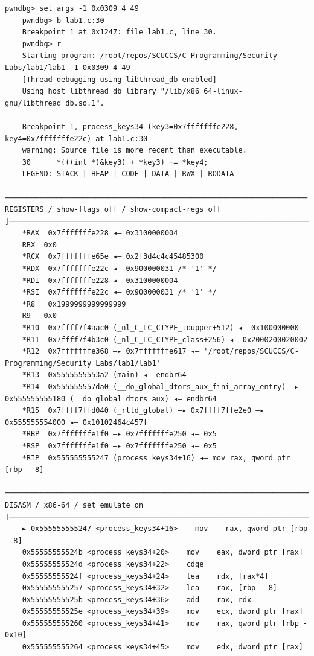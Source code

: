 \documentclass[a4pper,12pt,onecolumn]{article}
\begin{document}
\begin{lstlisting}[style=DOS]
    pwndbg> set args -1 0x0309 4 49
    pwndbg> b lab1.c:30
    Breakpoint 1 at 0x1247: file lab1.c, line 30.
    pwndbg> r
    Starting program: /root/repos/SCUCCS/C-Programming/Security Labs/lab1/lab1 -1 0x0309 4 49
    [Thread debugging using libthread_db enabled]
    Using host libthread_db library "/lib/x86_64-linux-gnu/libthread_db.so.1".

    Breakpoint 1, process_keys34 (key3=0x7fffffffe228, key4=0x7fffffffe22c) at lab1.c:30
    warning: Source file is more recent than executable.
    30	    *(((int *)&key3) + *key3) += *key4;
    LEGEND: STACK | HEAP | CODE | DATA | RWX | RODATA
    ──────────────────────────────────────────────────────────────────────[ REGISTERS / show-flags off / show-compact-regs off ]───────────────────────────────────────────────────────────────────────
    *RAX  0x7fffffffe228 ◂— 0x3100000004
    RBX  0x0
    *RCX  0x7fffffffe65e ◂— 0x2f3d4c4c45485300
    *RDX  0x7fffffffe22c ◂— 0x900000031 /* '1' */
    *RDI  0x7fffffffe228 ◂— 0x3100000004
    *RSI  0x7fffffffe22c ◂— 0x900000031 /* '1' */
    *R8   0x1999999999999999
    R9   0x0
    *R10  0x7ffff7f4aac0 (_nl_C_LC_CTYPE_toupper+512) ◂— 0x100000000
    *R11  0x7ffff7f4b3c0 (_nl_C_LC_CTYPE_class+256) ◂— 0x2000200020002
    *R12  0x7fffffffe368 —▸ 0x7fffffffe617 ◂— '/root/repos/SCUCCS/C-Programming/Security Labs/lab1/lab1'
    *R13  0x5555555553a2 (main) ◂— endbr64 
    *R14  0x555555557da0 (__do_global_dtors_aux_fini_array_entry) —▸ 0x555555555180 (__do_global_dtors_aux) ◂— endbr64 
    *R15  0x7ffff7ffd040 (_rtld_global) —▸ 0x7ffff7ffe2e0 —▸ 0x555555554000 ◂— 0x10102464c457f
    *RBP  0x7fffffffe1f0 —▸ 0x7fffffffe250 ◂— 0x5
    *RSP  0x7fffffffe1f0 —▸ 0x7fffffffe250 ◂— 0x5
    *RIP  0x555555555247 (process_keys34+16) ◂— mov rax, qword ptr [rbp - 8]
    ───────────────────────────────────────────────────────────────────────────────[ DISASM / x86-64 / set emulate on ]────────────────────────────────────────────────────────────────────────────────
    ► 0x555555555247 <process_keys34+16>    mov    rax, qword ptr [rbp - 8]
    0x55555555524b <process_keys34+20>    mov    eax, dword ptr [rax]
    0x55555555524d <process_keys34+22>    cdqe   
    0x55555555524f <process_keys34+24>    lea    rdx, [rax*4]
    0x555555555257 <process_keys34+32>    lea    rax, [rbp - 8]
    0x55555555525b <process_keys34+36>    add    rax, rdx
    0x55555555525e <process_keys34+39>    mov    ecx, dword ptr [rax]
    0x555555555260 <process_keys34+41>    mov    rax, qword ptr [rbp - 0x10]
    0x555555555264 <process_keys34+45>    mov    edx, dword ptr [rax]

\end{lstlisting}
\end{document}
